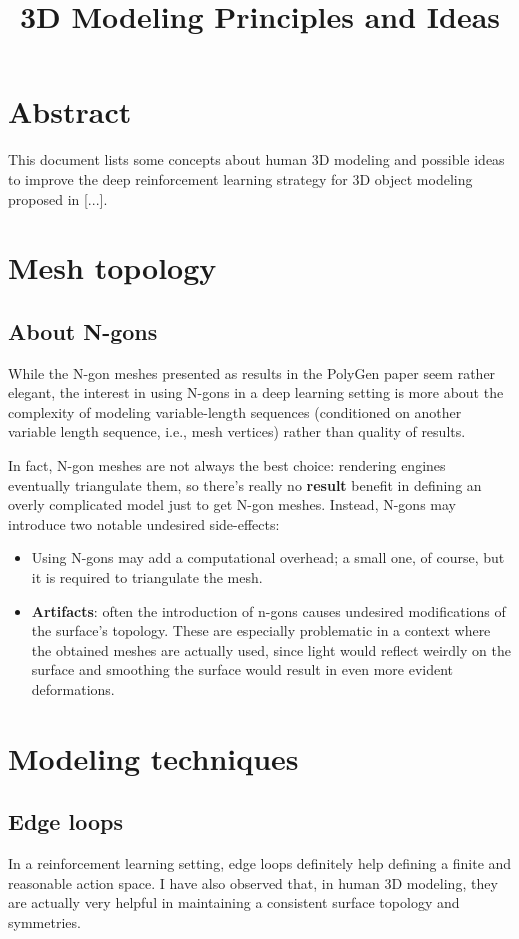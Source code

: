 \documentclass{article}
\title{3D Modeling Principles and Ideas}
\date{}
\begin{document}
\maketitle

\section{Abstract}
This document lists some concepts about human 3D modeling and possible ideas to improve the deep reinforcement learning strategy for 3D object modeling proposed in [...].


\section{Mesh topology}
\subsection{About N-gons}
While the N-gon meshes presented as results in the PolyGen paper seem rather elegant, the interest in using N-gons in a deep learning setting is more about the complexity of modeling variable-length sequences (conditioned on another variable length sequence, i.e., mesh vertices) rather than quality of results.

In fact, N-gon meshes are not always the best choice: rendering engines eventually triangulate them, so there's really no \textbf{result} benefit in defining an overly complicated model just to get N-gon meshes.
Instead, N-gons may introduce two notable undesired side-effects:
\begin{itemize}
	\item Using N-gons may add a computational overhead; a small one, of course, but it is required to triangulate the mesh. 
	\item \textbf{Artifacts}: often the introduction of n-gons causes undesired modifications of the surface's topology. These are especially problematic in a context where the obtained meshes are actually used, since light would reflect weirdly on the surface and smoothing the surface would result in even more evident deformations. 
\end{itemize}

\section{Modeling techniques}
\subsection{Edge loops}
In a reinforcement learning setting, edge loops definitely help defining a finite and reasonable action space. I have also observed that, in human 3D modeling, they are actually very helpful in maintaining a consistent surface topology and symmetries.
 
\end{document}

